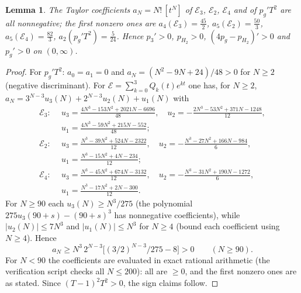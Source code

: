 \documentclass[11pt]{amsart}
\newtheorem{lemma}[theorem]{Lemma}
\theoremstyle{definition}
\theoremstyle{remark}
\begin{document}
\begin{lemma}\label{R2:lem:taylor}
The Taylor coefficients $a_N=N!\,[t^N]$ of $\mathcal E_3$, $\mathcal E_2$,
$\mathcal E_4$ and of $p_g'T^2$ are all nonnegative; the first nonzero ones
are $a_4(\mathcal E_3)=\frac{45}2$, $a_5(\mathcal E_2)=\frac{50}3$,
$a_5(\mathcal E_4)=\frac{82}3$, $a_2(p_g'T^2)=\frac5{24}$. Hence $p_3'>0$,
$p_{H_2}>0$, $(4p_g-p_{H_2})'>0$ and $p_g'>0$ on $(0,\infty)$.
\end{lemma}
\begin{proof}
For $p_g'T^2$: $a_0=a_1=0$ and $a_N=(N^2-9N+24)/48>0$ for $N\ge2$ (negative
discriminant). For $\mathcal E=\sum_{k=0}^3Q_k(t)e^{kt}$ one has, for
$N\ge2$, $a_N=3^{N-3}u_3(N)+2^{N-3}u_2(N)+u_1(N)$ with
\begin{align*}
 \mathcal E_3:\ \ & u_3=\tfrac{4N^3-153N^2+2021N-6696}{48},\quad
 u_2=-\tfrac{2N^3-53N^2+371N-1248}{12},\\
 & u_1=\tfrac{4N^3-59N^2+215N-552}{48};\\
 \mathcal E_2:\ \ & u_3=\tfrac{N^3-39N^2+524N-2322}{12},\quad
 u_2=-\tfrac{N^3-27N^2+166N-984}{6},\\
 & u_1=\tfrac{N^3-15N^2+4N-234}{12};\\
 \mathcal E_4:\ \ & u_3=\tfrac{N^3-45N^2+674N-3132}{12},\quad
 u_2=-\tfrac{N^3-31N^2+190N-1272}{6},\\
 & u_1=\tfrac{N^3-17N^2+2N-300}{12}.
\end{align*}
For $N\ge90$ each $u_3(N)\ge N^3/275$ (the polynomial $275u_3(90+s)-(90+s)^3$
has nonnegative coefficients), while $|u_2(N)|\le7N^3$ and $|u_1(N)|\le N^3$
for $N\ge4$ (bound each coefficient using $N\ge4$). Hence
\[
 a_N\ge N^3\,2^{N-3}\bigl[(3/2)^{N-3}/275-8\bigr]>0\qquad(N\ge90).
\]
For $N<90$ the coefficients are evaluated in exact rational arithmetic (the
verification script checks all $N\le200$): all are $\ge0$, and the first
nonzero ones are as stated. Since $(T-1)^2T^2>0$, the
sign claims follow.
\end{proof}
\end{document}

